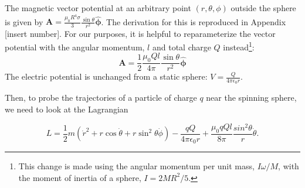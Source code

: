 \documentclass[11pt]{article}
\begin{document}
 The magnetic vector potential at an arbitrary point $(r,\theta,\phi)$ outside the sphere is given by $\mathbf{A} = \frac{\mu_0R^4\sigma}{3}\frac{\sin\theta}{r^2}\mathbf{\hat{\phi}}$.  The derivation for this is reproduced in Appendix [insert number].  For our purposes, it is helpful to reparameterize the vector potential with the angular momentum, $l$ and total charge $Q$ instead\footnote{This change is made using the angular momentum per unit mass, $I\omega/M$, with the moment of inertia of a sphere, $I = 2MR^2/5$.}:
 \begin{equation}
 \mathbf{A} = \frac{1}{2}\frac{\mu_0 Q l}{4\pi}\frac{\sin\theta}{r^2}\mathbf{\hat{\phi}}
 \end{equation}
The electric potential is unchanged from a static sphere: $V = \frac{Q}{4\pi\epsilon_0r}$.


Then, to probe the trajectories of a particle of charge $q$ near the spinning sphere, we need to look at the Lagrangian

\begin{equation}\label{eq:particle_lagr}
L = \frac{1}{2}m\left(\dot{r}^2 + r\cos\dot{\theta} + r\sin^2\theta\dot{\phi}\right) - \frac{qQ}{4\pi\epsilon_0r} + \frac{\mu_0qQl}{8\pi}\frac{sin^2\theta}{r}\dot{\theta}.
\end{equation}
 
 
\end{document}
